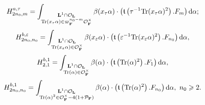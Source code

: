 \documentclass[A4]{amsart}
\def\geq{\geqslant}
\numberwithin{equation}{section} \everymath{\displaystyle}
\newcommand{\Tr}{{\rm Tr}}
\newcommand{\ud}{\mathrm{d}}
\newcommand{\F}{\mathbf{F}}
\newcommand{\bL}{\mathbf{L}}
\newcommand{\vO}{\mathcal{O}}
\newcommand{\vP}{\mathcal{P}}
\newcommand{\Trans}{\mathfrak{t}}
\begin{document}
	$$ H_{2n_0, m}^{a,\tau} = \int_{\substack{\bL^1 \cap \vO_{\bL} \\ \Tr(x_{\tau} \alpha) \in \varpi_{\F}^{n_0-m} \vO_{\F}^{\times}}} \beta(x_{\tau} \alpha) \cdot \left( \Trans \left( \tau^{-1} \Tr(x_{\tau} \alpha)^2 \right).F_{m} \right) \ud \alpha; $$
	$$ H_{2n_0,n_0}^{b,\varepsilon} = \int_{\substack{\bL^1 \cap \vO_{\bL} \\ \Tr(x_{\varepsilon} \alpha) \in \vO_{\F}^{\times}}} \beta(x_{\varepsilon} \alpha) \cdot \left( \Trans \left( \varepsilon^{-1} \Tr(x_{\varepsilon} \alpha)^2 \right).F_{n_0} \right) \ud \alpha, $$
	$$ H_{2,1}^{b,1} = \int_{\substack{\bL^1 \cap \vO_{\bL} \\ \Tr(\alpha) \in \vO_{\F}^{\times}}} \beta(\alpha) \cdot \left( \Trans \left( \Tr(\alpha)^2 \right).F_{1} \right) \ud \alpha, $$
	$$ H_{2n_0,n_0}^{b,1} = \int_{\substack{\bL^1 \cap \vO_{\bL} \\ \Tr(\alpha)^2 \in \vO_{\F}^{\times}-4(1+\vP_{\F})}} \beta(\alpha) \cdot \left( \Trans \left( \Tr(\alpha)^2 \right).F_{n_0} \right) \ud \alpha, \ n_0 \geq 2. $$
\end{document}
